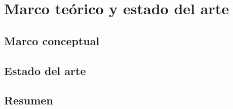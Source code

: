 \chapter{Marco teórico y estado del arte}


\section{Marco conceptual}


\section{Estado del arte}


\section{Resumen}
